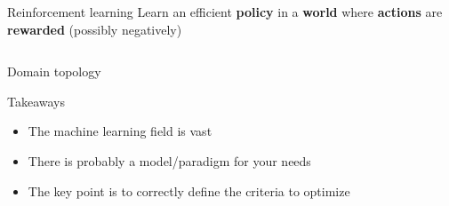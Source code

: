 \begin{frame}{Reinforcement learning}
  Learn an efficient \textbf{policy} in a \textbf{world} where \textbf{actions} are \textbf{rewarded} (possibly negatively)
  \vfill
  \begin{columns}[T]
    \begin{column}{0.5\textwidth}
    \end{column}
    \begin{column}{0.5\textwidth}
    \end{column}
  \end{columns}
\end{frame}

\begin{frame}{Domain topology}
\end{frame}

\begin{frame}{Takeaways}
  \begin{itemize}
  \item The machine learning field is vast
  \item There is probably a model/paradigm for your needs
  \item The key point is to correctly define the criteria to optimize
  \end{itemize}
\end{frame}
